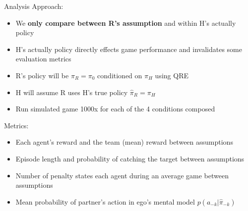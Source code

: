 \documentclass[aspectratio=1610, xcolor=dvipsnames]{packages/beamer}
\begin{document}
\begin{frame}{Analysis}
    Approach: \begin{itemize}
        \item We \textbf{only compare between R's assumption} and within H's actually policy
        \item H's actually policy directly effects game performance and invalidates some evaluation metrics
        \item R's policy will be $\pi_R=\pi_0$ conditioned on $\hat{\pi}_{H}$ using \ac{QRE}
        \item H will assume R uses H's true policy $\hat{\pi}_{R}=\pi_{H}$
        \item Run simulated game 1000x for each of the 4 conditions composed
    \end{itemize}
    Metrics: \begin{itemize}
        \item Each agent's reward and the team (mean) reward between assumptions
        \item Episode length and probability of catching the target between assumptions
        \item Number of penalty states each agent during an average game between assumptions
        \item Mean probability of partner's action in ego's mental model $p(a_{-k} | \hat{\pi}_{-k})$
    \end{itemize}
\end{frame}
\end{document}
